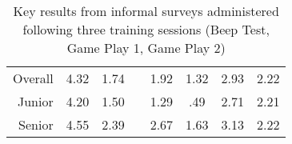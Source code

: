 \begin{table}[]
\begin{tabular}{@{}rcclcccc@{}}
Overall                                             & 4.32                                          & 1.74                                       &  & 1.92                                           & 1.32                                        & 2.93                                          & 2.22                                        \\
Junior                                              & 4.20                                           & 1.50                                        &  & 1.29                                           & .49                                        & 2.71                                          & 2.21                                        \\
Senior                                              & 4.55                                          & 2.39                                       &  & 2.67                                           & 1.63                                        & 3.13                                          & 2.22                                        \\ \bottomrule
\end{tabular}



\caption{Key results from informal surveys administered following three training sessions (Beep Test, Game Play 1, Game Play 2)}
\label{tab:postTrainingTable}
\end{table}
